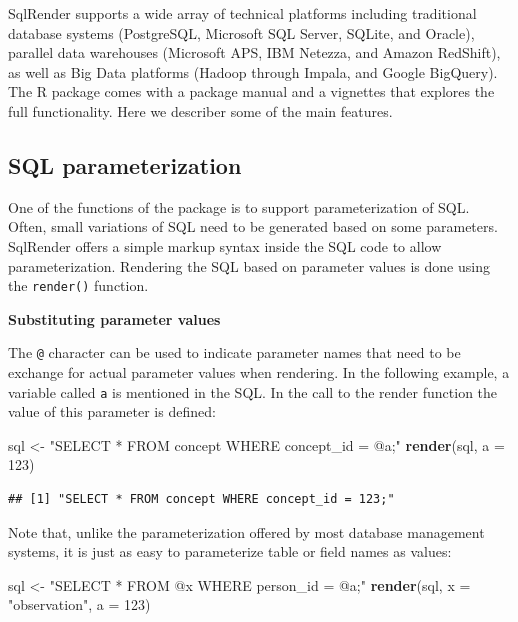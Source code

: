 \documentclass[11pt]{book}
\newenvironment{Shaded}{\begin{snugshade}}{\end{snugshade}}
\newcommand{\KeywordTok}[1]{\textcolor[rgb]{0.13,0.29,0.53}{\textbf{#1}}}
\newcommand{\DataTypeTok}[1]{\textcolor[rgb]{0.13,0.29,0.53}{#1}}
\newcommand{\DecValTok}[1]{\textcolor[rgb]{0.00,0.00,0.81}{#1}}
\newcommand{\StringTok}[1]{\textcolor[rgb]{0.31,0.60,0.02}{#1}}
\newcommand{\NormalTok}[1]{#1}
\begin{document}
SqlRender supports a wide array of technical platforms including
traditional database systems (PostgreSQL, Microsoft SQL Server, SQLite,
and Oracle), parallel data warehouses (Microsoft APS, IBM Netezza, and
Amazon RedShift), as well as Big Data platforms (Hadoop through Impala,
and Google BigQuery). The R package comes with a package manual and a
vignettes that explores the full functionality. Here we describer some
of the main features.

\subsection{SQL parameterization}\label{sql-parameterization}

One of the functions of the package is to support parameterization of
SQL. Often, small variations of SQL need to be generated based on some
parameters. SqlRender offers a simple markup syntax inside the SQL code
to allow parameterization. Rendering the SQL based on parameter values
is done using the \texttt{render()} function.

\textbf{Substituting parameter values}

The \texttt{@} character can be used to indicate parameter names that
need to be exchange for actual parameter values when rendering. In the
following example, a variable called \texttt{a} is mentioned in the SQL.
In the call to the render function the value of this parameter is
defined:

\begin{Shaded}
\begin{Highlighting}[]
\NormalTok{sql <-}\StringTok{ "SELECT * FROM concept WHERE concept_id = @a;"}
\KeywordTok{render}\NormalTok{(sql, }\DataTypeTok{a =} \DecValTok{123}\NormalTok{)}
\end{Highlighting}
\end{Shaded}

\begin{verbatim}
## [1] "SELECT * FROM concept WHERE concept_id = 123;"
\end{verbatim}

Note that, unlike the parameterization offered by most database
management systems, it is just as easy to parameterize table or field
names as values:

\begin{Shaded}
\begin{Highlighting}[]
\NormalTok{sql <-}\StringTok{ "SELECT * FROM @x WHERE person_id = @a;"}
\KeywordTok{render}\NormalTok{(sql, }\DataTypeTok{x =} \StringTok{"observation"}\NormalTok{, }\DataTypeTok{a =} \DecValTok{123}\NormalTok{)}
\end{Highlighting}
\end{Shaded}
\end{document}
